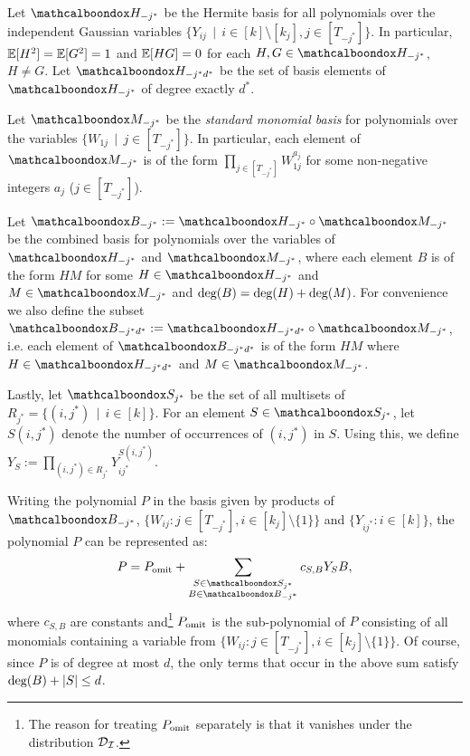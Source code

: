 \begin{definition}\label{def-hermite-basis-partial}
Let $\mcb{H}_{-j^*}$ be the Hermite basis for
all polynomials over the independent Gaussian variables $\{Y_{ij}\,\mid\, i \in [k]\setminus[k_j], j\in[T_{-j^*}]\}$.
In particular, $\mathbb{E}[H^2] = \mathbb{E}[G^2] = 1$ and $\mathbb{E}[HG] = 0$ for each
$H, G \in \mcb{H}_{-j^*}$, $H\neq G$. Let $\mcb{H}_{-j^*d^*}$  be the
set of basis elements of $\mcb{H}_{-j^*}$ of degree exactly $d^*$. 
\end{definition}
\begin{definition}\label{def-monomial-Ws-partial}
Let $\mcb{M}_{-j^*}$ be the \emph{standard monomial basis} for
polynomials over the variables $\{W_{1j}\,\mid\,j\in [T_{-j^*}]\}$. In
particular, each element of $\mcb{M}_{-j^*}$ is of the form
$\prod_{j\in [T_{-j^*}]}W_{1j}^{a_j}$ for some non-negative integers
$a_j$ ($j \in [T_{-j^*}]$).
\end{definition}
\begin{definition}\label{def-combined-basis}
Let $\mcb{B}_{-j^*} := \mcb{H}_{-j^*} \circ \mcb{M}_{-j^*}$ be the
combined basis for polynomials over the variables of 
$\mcb{H}_{-j^*}$ and $\mcb{M}_{-j^*}$, where each element $B$ is of
the form $HM$ for some $H \in \mcb{H}_{-j^*}$ and $M \in
\mcb{M}_{-j^*}$ and $\textnormal{deg}(B) = \textnormal{deg}(H) + \textnormal{deg}(M)$. For
convenience  we also define the subset $\mcb{B}_{-j^*d^*} := 
\mcb{H}_{-j^*d^*} \circ \mcb{M}_{-j^*}$, i.e. each element of 
$\mcb{B}_{-j^*d^*}$ is of the form $HM$ where $H \in
\mcb{H}_{-j^*d^*}$ and $M \in \mcb{M}_{-j^*}$.
\end{definition}
Lastly, let $\mcb{S}_{j^*}$ be the set of all multisets of
$R_{j^*} = \{(i,j^*)\,\mid\, i\in [k]\}$. For an element $S \in
\mcb{S}_{j^*}$, let $S(i,j^*)$ denote the number of occurrences of
$(i,j^*)$ in $S$. Using this, we define $Y_S := \prod_{(i,j^*) \in R_{j^*}} Y_{ij^*}^{S(i,j^*)}$.

\medskip
Writing the polynomial $P$  in the basis given by products of $\mcb{B}_{-j^*}$, $\{W_{ij}: j \in [T_{-j^*}], i \in [k_j]\setminus\{1\}\}$ and $\{Y_{ij^*}: i \in [k]\}$, 
the polynomial $P$ can be  
represented as:
\begin{equation}
P = P_{\tn{omit}} + \sum_{\substack{S\in \mcb{S}_{j^*} \\ B\in \mcb{B}_{-j^*}}}
c_{S, B}  Y_S B, \label{eqn-P-hybrid-rep}
\end{equation}
where $c_{S,B}$ are constants and\footnote{The reason for treating $P_{\textnormal{omit}}$ separately is that it vanishes under the distribution $\mathcal{D}_{\mathcal{I}}$.} $P_{\textnormal{omit}}$ is the sub-polynomial of $P$ consisting of all monomials containing a variable from $\{W_{ij}: j \in [T_{-j^*}], i \in [k_j]\setminus\{1\}\}$. Of course, since $P$ is of degree at
most $d$, the only terms that occur in the above sum satisfy
$\textnormal{deg}(B) + |S| \leq d$.

